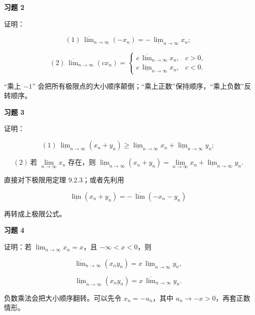 \begin{exercisebox}
\textbf{习题 2 }

证明：

\[
      (1)\ \overline{\lim}_{n\to\infty}(-x_n)
      =
      -\,\underline{\lim}_{n\to\infty}x_n;
      \]

\[
      (2)\ \overline{\lim}_{n\to\infty}(c x_n)
      =
      \begin{cases}
      c\,\overline{\lim}_{n\to\infty}x_n, & c>0,\\[4pt]
      c\,\underline{\lim}_{n\to\infty}x_n, & c<0.
      \end{cases}
      \]

\begin{hintbox}
“乘上 \(-1\)” 会把所有极限点的大小顺序颠倒；“乘上正数”保持顺序，“乘上负数”反转顺序。
\end{hintbox}
\end{exercisebox}

\begin{exercisebox}
\textbf{习题 3 }

证明：

\[
      (1)\ \underline{\lim}_{n\to\infty}(x_n+y_n)
      \ge
      \underline{\lim}_{n\to\infty}x_n
      +
      \underline{\lim}_{n\to\infty}y_n;
      \]

\[
      (2)\ \text{若 } \lim_{n\to\infty}x_n \text{ 存在，则 }
      \underline{\lim}_{n\to\infty}(x_n+y_n)
      =
      \lim_{n\to\infty}x_n
      +
      \underline{\lim}_{n\to\infty}y_n.
      \]

\begin{hintbox}
直接对下极限用定理 9.2.3；或者先利用

\[
          \underline{\lim}(x_n+y_n)
          =
          -\,\overline{\lim}(-x_n-y_n)
        \]

再转成上极限公式。
\end{hintbox}
\end{exercisebox}

\begin{exercisebox}
\textbf{习题 4 }

证明：若 \(\lim_{n\to\infty}x_n=x\)，且 \(-\infty<x<0\)，则

\[
        \overline{\lim}_{n\to\infty}(x_ny_n)
        =
        x\,\underline{\lim}_{n\to\infty}y_n,
      \]

\[
        \underline{\lim}_{n\to\infty}(x_ny_n)
        =
        x\,\overline{\lim}_{n\to\infty}y_n.
      \]

\begin{hintbox}
负数乘法会把大小顺序翻转。可以先令 \(x_n=-u_n\)，其中 \(u_n\to -x>0\)，再套正数情形。
\end{hintbox}
\end{exercisebox}


